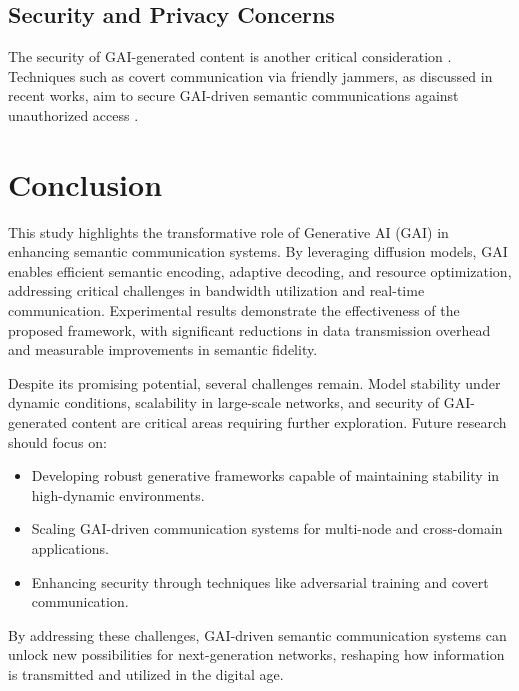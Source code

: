 \documentclass[journal]{IEEEtran}
\begin{document}
\subsection{Security and Privacy Concerns}
The security of GAI-generated content is another critical consideration \cite{10447237}. Techniques such as covert communication via friendly jammers, as discussed in recent works, aim to secure GAI-driven semantic communications against unauthorized access \cite{9797984}.

\section{Conclusion}
This study highlights the transformative role of Generative AI (GAI) in enhancing semantic communication systems. By leveraging diffusion models, GAI enables efficient semantic encoding, adaptive decoding, and resource optimization, addressing critical challenges in bandwidth utilization and real-time communication. Experimental results demonstrate the effectiveness of the proposed framework, with significant reductions in data transmission overhead and measurable improvements in semantic fidelity.

Despite its promising potential, several challenges remain. Model stability under dynamic conditions, scalability in large-scale networks, and security of GAI-generated content are critical areas requiring further exploration. Future research should focus on:
\begin{itemize}
    \item Developing robust generative frameworks capable of maintaining stability in high-dynamic environments.
    \item Scaling GAI-driven communication systems for multi-node and cross-domain applications.
    \item Enhancing security through techniques like adversarial training and covert communication.
\end{itemize}

By addressing these challenges, GAI-driven semantic communication systems can unlock new possibilities for next-generation networks, reshaping how information is transmitted and utilized in the digital age.





\end{document}
